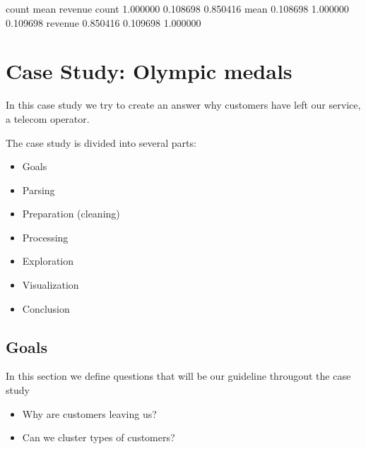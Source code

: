 \documentclass[letterpaper,10pt,english]{jupyterBook}
\begin{document}
\begin{sphinxVerbatim}[commandchars=\\\{\}]
\end{sphinxVerbatim}

\begin{sphinxVerbatim}[commandchars=\\\{\}]
            count      mean   revenue
count    1.000000 \PYGZhy{}0.108698  0.850416
mean    \PYGZhy{}0.108698  1.000000 \PYGZhy{}0.109698
revenue  0.850416 \PYGZhy{}0.109698  1.000000
\end{sphinxVerbatim}


\chapter{Case Study: Olympic medals}
\label{\detokenize{c7_case_studies/Churn:case-study-olympic-medals}}\label{\detokenize{c7_case_studies/Churn::doc}}
\sphinxAtStartPar
In this case study we try to create an answer why customers have left our service, a telecom operator.

\sphinxAtStartPar
The case study is divided into several parts:
\begin{itemize}
\item {} 
\sphinxAtStartPar
Goals

\item {} 
\sphinxAtStartPar
Parsing

\item {} 
\sphinxAtStartPar
Preparation (cleaning)

\item {} 
\sphinxAtStartPar
Processing

\item {} 
\sphinxAtStartPar
Exploration

\item {} 
\sphinxAtStartPar
Visualization

\item {} 
\sphinxAtStartPar
Conclusion

\end{itemize}


\section{Goals}
\label{\detokenize{c7_case_studies/Churn:goals}}
\sphinxAtStartPar
In this section we define questions that will be our guideline througout the case study
\begin{itemize}
\item {} 
\sphinxAtStartPar
Why are customers leaving us?

\item {} 
\sphinxAtStartPar
Can we cluster types of customers?

\end{itemize}
\end{document}
